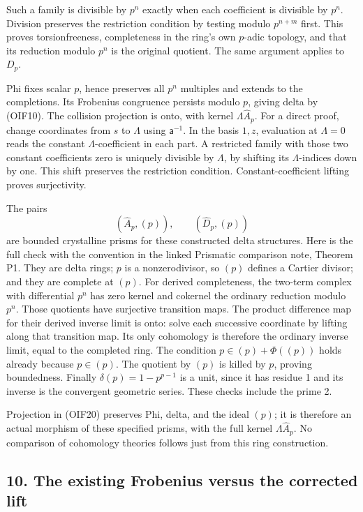 \documentclass[
]{article}
\begin{document}
Such a family is divisible by \(p^n\) exactly when each coefficient is
divisible by \(p^n\). Division preserves the restriction condition by
testing modulo \(p^{n+m}\) first. This proves torsionfreeness,
completeness in the ring's own \(p\)-adic topology, and that its
reduction modulo \(p^n\) is the original quotient. The same argument
applies to \(D_p\).

Phi fixes scalar \(p\), hence preserves all \(p^n\) multiples and
extends to the completions. Its Frobenius congruence persists modulo
\(p\), giving delta by (OIF10). The collision projection is onto, with
kernel \(\Lambda\widehat A_p\). For a direct proof, change coordinates
from \(s\) to \(\Lambda\) using \(\mathsf a^{-1}\). In the basis
\(1,z\), evaluation at \(\Lambda=0\) reads the constant
\(\Lambda\)-coefficient in each part. A restricted family with those two
constant coefficients zero is uniquely divisible by \(\Lambda\), by
shifting its \(\Lambda\)-indices down by one. This shift preserves the
restriction condition. Constant-coefficient lifting proves surjectivity.

The pairs \[
(\widehat A_p,(p)),\qquad(\widehat D_p,(p))
\tag{OIF20}
\] are bounded crystalline prisms for these constructed delta
structures. Here is the full check with the convention in the linked
Prismatic comparison note, Theorem P1. They are delta rings; \(p\) is a
nonzerodivisor, so \((p)\) defines a Cartier divisor; and they are
complete at \((p)\). For derived completeness, the two-term complex with
differential \(p^n\) has zero kernel and cokernel the ordinary reduction
modulo \(p^n\). Those quotients have surjective transition maps. The
product difference map for their derived inverse limit is onto: solve
each successive coordinate by lifting along that transition map. Its
only cohomology is therefore the ordinary inverse limit, equal to the
completed ring. The condition \(p\in(p)+\Phi((p))\) holds already
because \(p\in(p)\). The quotient by \((p)\) is killed by \(p\), proving
boundedness. Finally \(\delta(p)=1-p^{p-1}\) is a unit, since it has
residue 1 and its inverse is the convergent geometric series. These
checks include the prime 2.

Projection in (OIF20) preserves Phi, delta, and the ideal \((p)\); it is
therefore an actual morphism of these specified prisms, with the full
kernel \(\Lambda\widehat A_p\). No comparison of cohomology theories
follows just from this ring construction.

\subsection{10. The existing Frobenius versus the corrected
lift}\label{the-existing-frobenius-versus-the-corrected-lift}
\end{document}
